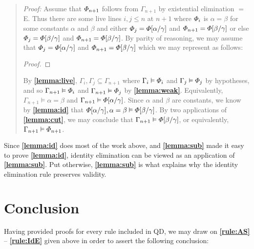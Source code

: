 \begin{quote} 
  \textit{Proof:} Assume that $\varPhi_{n+1}$ follows from $\Gamma_{n+1}$ by existential elimination $=$E.
  Thus there are some live lines $i,j\leq n$ at $n+1$ where $\varPhi_i$ is $\alpha=\beta$ for some constants $\alpha$ and $\beta$ and either $\varPhi_j=\varPhi[\alpha/\gamma]$ and $\varPhi_{n+1}=\varPhi[\beta/\gamma]$ or else $\varPhi_j=\varPhi[\beta/\gamma]$ and $\varPhi_{n+1}=\varPhi[\beta/\gamma]$.
  By parity of reasoning, we may assume that $\varPhi_j=\varPhi[\alpha/\gamma]$ and $\varPhi_{n+1}=\varPhi[\beta/\gamma]$ which we may represent as follows:

  \begin{proof}
     
  \end{proof}

  By \textbf{\ref{lemma:live}}, $\Gamma_i,\Gamma_j\subseteq \Gamma_{n+1}$ where $\Gamma_i\vDash\varPhi_i$ and $\Gamma_j\vDash\varPhi_j$ by hypotheses, and so $\Gamma_{n+1} \vDash \varPhi_i$ and $\Gamma_{n+1} \vDash \varPhi_j$ by \textbf{\ref{lemma:weak}}.
  Equivalently, $\Gamma_{n+1} \models \alpha = \beta$ and $\Gamma_{n+1} \vDash \varPhi[\alpha/\gamma]$.
  Since $\alpha$ and $\beta$ are constants, we know by \textbf{\ref{lemma:id}} that $\varPhi[\alpha/\gamma], \alpha = \beta \vDash \varPhi[\beta/\gamma]$.
  By two applications of \textbf{\ref{lemma:cut}}, we may conclude that $\Gamma_{n+1}\vDash\varPhi[\beta/\gamma]$, or equivalently, $\Gamma_{n+1}\vDash\varPhi_{n+1}$.
\end{quote}


Since \textbf{\ref{lemma:id}} does most of the work above, and \textbf{\ref{lemma:sub}} made it easy to prove \textbf{\ref{lemma:id}}, identity elimination can be viewed as an application of \textbf{\ref{lemma:sub}}.
Put otherwise, \textbf{\ref{lemma:sub}} is what explains why the identity elimination rule preserves validity.




\section{Conclusion}%
  \label{sec:Conclusion}

Having provided proofs for every rule included in QD, we may draw on \textbf{\ref{rule:AS}} -- \textbf{\ref{rule:IdE}} given above in order to assert the following conclusion:
  

